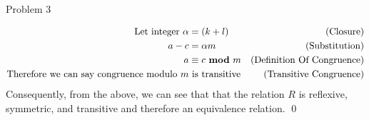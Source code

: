 \begin{problem}{Problem 3}
\begin{highlight}[Solution]
\begin{align*}
            \text{Let integer } \alpha & = (k + l) & \text{(Closure)} \\
            a - c & = \alpha m & \text{(Substitution)} \\
            a & \equiv c \text{ \textbf{mod} } m & \text{(Definition Of Congruence)} \\
            \text{Therefore we can say congruence modulo } m & \text{ is transitive} & \text{(Transitive Congruence)}
        \end{align*}
        Consequently, from the above, we can see that that the relation $R$ is reflexive, symmetric, and transitive and therefore an equivalence relation. \qed
    \end{highlight}
\end{problem}